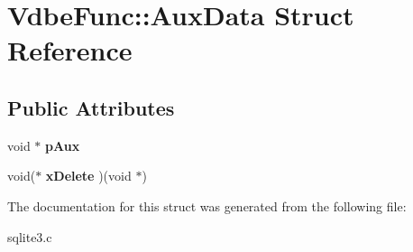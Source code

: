 \hypertarget{struct_vdbe_func_1_1_aux_data}{\section{Vdbe\-Func\-:\-:Aux\-Data Struct Reference}
\label{struct_vdbe_func_1_1_aux_data}
}
\subsection*{Public Attributes}
\begin{DoxyCompactItemize}
\item 
\hypertarget{struct_vdbe_func_1_1_aux_data_ad2ceeac1dec76bbb661f6418ec582539}{void $\ast$ {\bfseries p\-Aux}}\label{struct_vdbe_func_1_1_aux_data_ad2ceeac1dec76bbb661f6418ec582539}

\item 
\hypertarget{struct_vdbe_func_1_1_aux_data_a6742f89d0634b5fc6684f245bac76fd5}{void($\ast$ {\bfseries x\-Delete} )(void $\ast$)}\label{struct_vdbe_func_1_1_aux_data_a6742f89d0634b5fc6684f245bac76fd5}

\end{DoxyCompactItemize}


The documentation for this struct was generated from the following file\-:\begin{DoxyCompactItemize}
\item 
sqlite3.\-c\end{DoxyCompactItemize}
